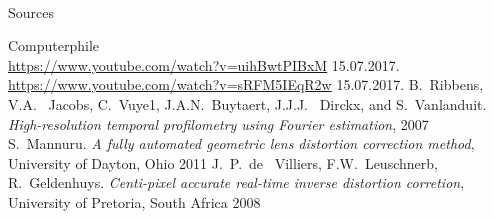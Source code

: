 \documentclass[accentcolor=tud4b,colorbacktitle,inverttitle,landscape,german,presentation,t]{tudbeamer}
\begin{document}
\begin{frame}{\\Sources}
\begin{thebibliography}{1}
Computerphile \\
\url {https://www.youtube.com/watch?v=uihBwtPIBxM}
15.07.2017.\\
\url {https://www.youtube.com/watch?v=sRFM5IEqR2w}
15.07.2017.
B.~Ribbens, V.A.~ Jacobs, C.~Vuye1, J.A.N.~Buytaert, J.J.J.~ Dirckx, and S.~Vanlanduit. \emph{High-resolution temporal profilometry using Fourier estimation}, 2007
S.~Mannuru. \emph{A fully automated geometric lens distortion correction method}, University of Dayton, Ohio 2011
J.~P.~de ~Villiers, F.W.~Leuschnerb, R.~Geldenhuys. \emph{Centi-pixel accurate real-time inverse distortion corretion}, University of Pretoria, South Africa 2008
\end{thebibliography}
\end{frame}
\end{document}
